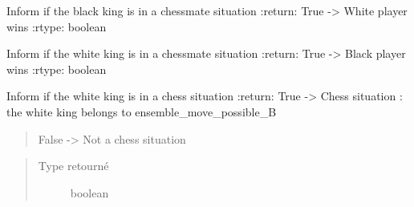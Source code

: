 \documentclass[letterpaper,10pt,french]{sphinxmanual}
\begin{document}

\begin{fulllineitems}
\label{\detokenize{autodoc:echecs.chess_Mate_B}}
Inform if the black king is in a chessmate situation
:return: True -\textgreater{} White player wins
:rtype: boolean

\end{fulllineitems}


\begin{fulllineitems}
\label{\detokenize{autodoc:echecs.chess_Mate_W}}
Inform if the white king is in a chessmate situation
:return: True -\textgreater{} Black player wins
:rtype: boolean

\end{fulllineitems}


\begin{fulllineitems}
\label{\detokenize{autodoc:echecs.chess_W}}
Inform if the white king is in a chess situation
:return: True -\textgreater{} Chess situation : the white king belongs to ensemble\_move\_possible\_B
\begin{quote}

False -\textgreater{} Not a chess situation
\end{quote}
\begin{quote}\begin{description}
\item[{Type retourné}] \leavevmode
boolean

\end{description}\end{quote}

\end{fulllineitems}


\begin{fulllineitems}
\label{\detokenize{autodoc:echecs.copy}}
\end{fulllineitems}

\end{document}
